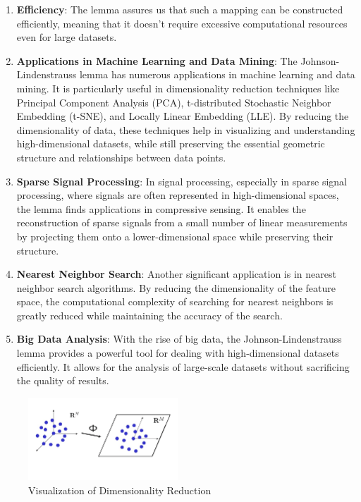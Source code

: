 \documentclass{article}
\renewcommand{\_}{\ifincsname_\else\legacyunderscore\fi}
\begin{document}
\begin{enumerate}
    \item \textbf{Efficiency}: The lemma assures us that such a mapping can be constructed efficiently, meaning that it doesn't require excessive computational resources even for large datasets.
    
    \item \textbf{Applications in Machine Learning and Data Mining}: The Johnson-Lindenstrauss lemma has numerous applications in machine learning and data mining. It is particularly useful in dimensionality reduction techniques like Principal Component Analysis (PCA), t-distributed Stochastic Neighbor Embedding (t-SNE), and Locally Linear Embedding (LLE). By reducing the dimensionality of data, these techniques help in visualizing and understanding high-dimensional datasets, while still preserving the essential geometric structure and relationships between data points.
    
    \item \textbf{Sparse Signal Processing}: In signal processing, especially in sparse signal processing, where signals are often represented in high-dimensional spaces, the lemma finds applications in compressive sensing. It enables the reconstruction of sparse signals from a small number of linear measurements by projecting them onto a lower-dimensional space while preserving their structure.
    
    \item \textbf{Nearest Neighbor Search}: Another significant application is in nearest neighbor search algorithms. By reducing the dimensionality of the feature space, the computational complexity of searching for nearest neighbors is greatly reduced while maintaining the accuracy of the search.
    
    \item \textbf{Big Data Analysis}: With the rise of big data, the Johnson-Lindenstrauss lemma provides a powerful tool for dealing with high-dimensional datasets efficiently. It allows for the analysis of large-scale datasets without sacrificing the quality of results.
\end{enumerate}

\begin{figure}[h]
    \centering
    \includegraphics[width=0.5\textwidth]{dimensionality_reduction.png}
    \caption{Visualization of Dimensionality Reduction}
    \label{fig:dimensionality_reduction}
\end{figure}
\newpage
\end{document}
